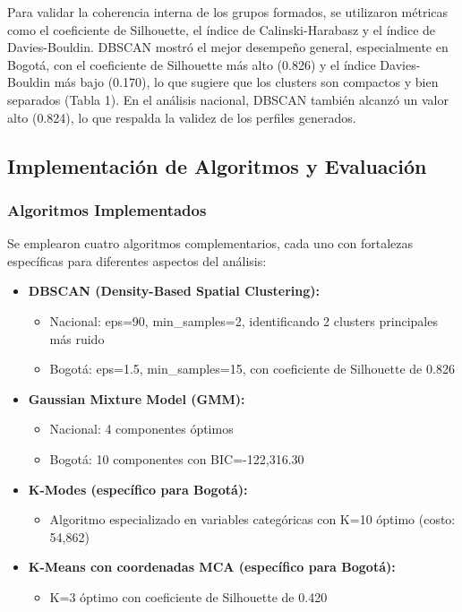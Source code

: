 \documentclass[lettersize,journal]{IEEEtran}
\begin{document}
Para validar la coherencia interna de los grupos formados, se utilizaron métricas como el coeficiente de Silhouette, el índice de Calinski-Harabasz y el índice de Davies-Bouldin. DBSCAN mostró el mejor desempeño general, especialmente en Bogotá, con el coeficiente de Silhouette más alto (0.826) y el índice Davies-Bouldin más bajo (0.170), lo que sugiere que los clusters son compactos y bien separados (Tabla 1). En el análisis nacional, DBSCAN también alcanzó un valor alto (0.824), lo que respalda la validez de los perfiles generados.

\subsection{Implementación de Algoritmos y Evaluación}

\subsubsection{Algoritmos Implementados}
Se emplearon cuatro algoritmos complementarios, cada uno con fortalezas específicas para diferentes aspectos del análisis:

\begin{itemize}
    \item \textbf{DBSCAN (Density-Based Spatial Clustering):}
    \begin{itemize}
        \item Nacional: eps=90, min\_samples=2, identificando 2 clusters principales más ruido
        \item Bogotá: eps=1.5, min\_samples=15, con coeficiente de Silhouette de 0.826
    \end{itemize}
    
    \item \textbf{Gaussian Mixture Model (GMM):}
    \begin{itemize}
        \item Nacional: 4 componentes óptimos
        \item Bogotá: 10 componentes con BIC=-122,316.30
    \end{itemize}
    
    \item \textbf{K-Modes (específico para Bogotá):}
    \begin{itemize}
        \item Algoritmo especializado en variables categóricas con K=10 óptimo (costo: 54,862)
    \end{itemize}
    
    \item \textbf{K-Means con coordenadas MCA (específico para Bogotá):}
    \begin{itemize}
        \item K=3 óptimo con coeficiente de Silhouette de 0.420
    \end{itemize}
\end{itemize}
\end{document}
